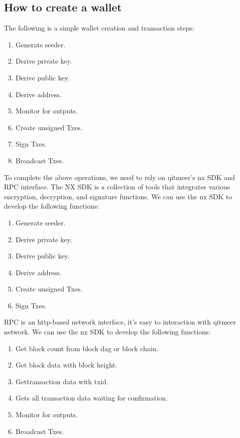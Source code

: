 \documentclass[a4paper,11pt]{article}
\begin{document}
\subsection*{How to create a wallet}
   The following is a simple wallet creation and transaction steps:
\begin{enumerate}
	\item  Generate seeder.
    \item  Derive private key.
    \item  Derive public key.
    \item  Derive address.
    \item  Monitor for outputs.
    \item  Create unsigned Txes.
    \item  Sign Txes.
    \item  Broadcast Txes.
\end{enumerate}

   To complete the above operations, we need to rely on qitmeer's nx SDK and RPC interface.
   The NX SDK is a collection of tools that integrates various encryption, decryption, and signature functions. We can use the nx SDK to develop the following functions:
   \begin{enumerate}
     \item Generate seeder.
     \item Derive private key.
     \item Derive public key.
     \item Derive address.
     \item Create unsigned Txes.
	 \item Sign Txes.
   \end{enumerate}

   RPC is an http-based network interface, it’s easy to interaction with qitmeer network. We can use the nx SDK to develop the following functions:

   \begin{enumerate}
    \item  Get block count from block dag or block chain.
    \item Get block data with block height.
    \item  Gettransaction data with txid.
    \item  Gets all transaction data waiting for confirmation.
    \item  Monitor for outputs.
    \item  Broadcast Txes.
   \end{enumerate}
\end{document}
